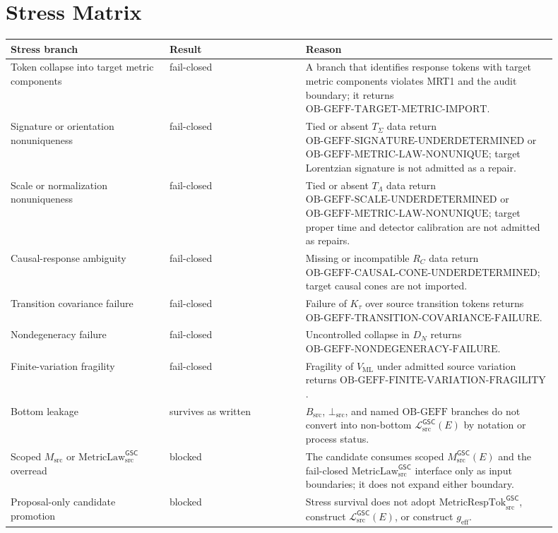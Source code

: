 \documentclass[11pt]{article}
\newcommand{\Msrc}{M_{\mathrm{src}}}
\newcommand{\MsrcGSC}{M_{\mathrm{src}}^{\mathsf{GSC}}}
\newcommand{\MetricLaw}{\mathrm{MetricLaw}_{\mathrm{src}}^{\mathsf{GSC}}}
\newcommand{\MetricRespTok}{\mathrm{MetricRespTok}_{\mathrm{src}}^{\mathsf{GSC}}}
\newcommand{\MetricData}{\mathcal{L}_{\mathrm{src}}^{\mathsf{GSC}}}
\newcommand{\BottomSrc}{\bot_{\mathrm{src}}}
\newcommand{\OBGEFF}{\mathrm{OB\mbox{-}GEFF}}
\newcommand{\geff}{g_{\mathrm{eff}}}
\begin{document}
\section{Stress Matrix}

\begin{longtable}{p{0.28\linewidth}p{0.24\linewidth}p{0.38\linewidth}}
\toprule
Stress branch & Result & Reason \\
\midrule
Token collapse into target metric components & fail-closed & A branch that
identifies response tokens with target metric components violates MRT1 and
the audit boundary; it returns
\(\mathrm{OB\mbox{-}GEFF\mbox{-}TARGET\mbox{-}METRIC\mbox{-}IMPORT}\). \\
Signature or orientation nonuniqueness & fail-closed & Tied or absent
\(T_{\Sigma}\) data return
\(\mathrm{OB\mbox{-}GEFF\mbox{-}SIGNATURE\mbox{-}UNDERDETERMINED}\) or
\(\mathrm{OB\mbox{-}GEFF\mbox{-}METRIC\mbox{-}LAW\mbox{-}NONUNIQUE}\);
target Lorentzian signature is not admitted as a repair. \\
Scale or normalization nonuniqueness & fail-closed & Tied or absent
\(T_{\Lambda}\) data return
\(\mathrm{OB\mbox{-}GEFF\mbox{-}SCALE\mbox{-}UNDERDETERMINED}\) or
\(\mathrm{OB\mbox{-}GEFF\mbox{-}METRIC\mbox{-}LAW\mbox{-}NONUNIQUE}\);
target proper time and detector calibration are not admitted as repairs. \\
Causal-response ambiguity & fail-closed & Missing or incompatible \(R_C\)
data return
\(\mathrm{OB\mbox{-}GEFF\mbox{-}CAUSAL\mbox{-}CONE\mbox{-}UNDERDETERMINED}\);
target causal cones are not imported. \\
Transition covariance failure & fail-closed & Failure of \(K_{\tau}\) over
source transition tokens returns
\(\mathrm{OB\mbox{-}GEFF\mbox{-}TRANSITION\mbox{-}COVARIANCE\mbox{-}FAILURE}\).
\\
Nondegeneracy failure & fail-closed & Uncontrolled collapse in \(D_N\) returns
\(\mathrm{OB\mbox{-}GEFF\mbox{-}NONDEGENERACY\mbox{-}FAILURE}\). \\
Finite-variation fragility & fail-closed & Fragility of \(V_{\mathrm{ML}}\)
under admitted source variation returns
\(\mathrm{OB\mbox{-}GEFF\mbox{-}FINITE\mbox{-}VARIATION\mbox{-}FRAGILITY}\).
\\
Bottom leakage & survives as written & \(B_{\mathrm{src}}\), \(\BottomSrc\),
and named \(\OBGEFF\) branches do not convert into non-bottom
\(\MetricData(E)\) by notation or process status. \\
Scoped \(\Msrc\) or \(\MetricLaw\) overread & blocked & The candidate consumes
scoped \(\MsrcGSC(E)\) and the fail-closed \(\MetricLaw\) interface only as
input boundaries; it does not expand either boundary. \\
Proposal-only candidate promotion & blocked & Stress survival does not adopt
\(\MetricRespTok\), construct \(\MetricData(E)\), or construct \(\geff\). \\
\bottomrule
\end{longtable}
\end{document}
